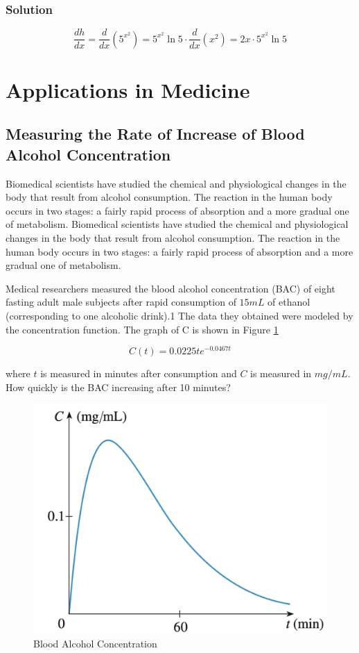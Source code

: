 \subsubsection{Solution}
$$
    \frac{dh}{dx}=\frac{d}{dx}(5^{x^2})=5^{x^2} \ln 5 \cdot \frac{d}{dx}(x^2)=2x \cdot 5^{x^2} \ln 5 
$$

\section{Applications in Medicine}

\subsection{Measuring the Rate of Increase of Blood Alcohol Concentration}

Biomedical scientists have studied the chemical and physiological changes in the body that result from alcohol consumption. The reaction in the human body occurs in two stages: a fairly rapid process of absorption and a more gradual one of metabolism. Biomedical scientists have studied the chemical and physiological changes in the body that result from alcohol consumption. The reaction in the human body occurs in two stages: a fairly rapid process of absorption and a more gradual one of metabolism.

Medical researchers measured the blood alcohol concentration (BAC) of eight fasting adult male subjects after rapid consumption of $15 mL$ of ethanol (corresponding to one alcoholic drink).1 The data they obtained were modeled by the concentration function. The graph of C is shown in Figure \ref{fig:Fig5}

\begin{equation}
\label{eq:4}
C(t) = 0.0225te^{-0.0467t}
\end{equation}

where $t$ is measured in minutes after consumption and $C$ is measured in $mg/mL$. How quickly is the BAC increasing after 10 minutes?

\begin{figure}[h]
    \centering
    \includegraphics[scale=0.3]{chapter001/figures/fig005}
    \caption{Blood Alcohol Concentration}
    \label{fig:Fig5}
\end{figure}


